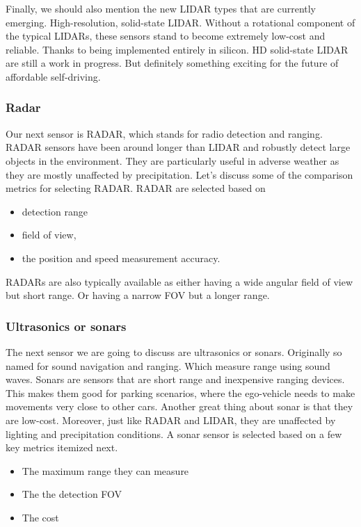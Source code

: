 Finally, we should also mention the new
LIDAR types that are currently emerging. High-resolution, solid-state LIDAR. Without a rotational component
of the typical LIDARs, these sensors stand to become
extremely low-cost and reliable. Thanks to being implemented
entirely in silicon. HD solid-state LIDAR
are still a work in progress. But definitely something exciting for
the future of affordable self-driving. 

\subsubsection{Radar}

Our next sensor is RADAR, which stands for radio detection and ranging. RADAR sensors have been
around longer than LIDAR and robustly detect large objects in the environment. They are particularly useful in adverse
weather as they are mostly unaffected by precipitation. Let's discuss some of the comparison
metrics for selecting RADAR. RADAR are selected based on

\begin{itemize}
\item detection range
\item field of view, 
\item the position and speed measurement accuracy. 
\end{itemize}

RADARs are also typically available as either having a wide angular field of view but short range. 
Or having a narrow FOV but a longer range. 


\subsubsection{Ultrasonics or sonars}

The next sensor we are going to discuss are ultrasonics or sonars. Originally so named for
sound navigation and ranging. Which measure range using sound waves. Sonars are sensors that are short
range and inexpensive ranging devices. This makes them good for parking scenarios, where the ego-vehicle needs to make
movements very close to other cars. Another great thing about sonar is that they are low-cost. Moreover, just like RADAR and LIDAR,
they are unaffected by lighting and precipitation conditions. A sonar sensor is selected based
on a few key metrics itemized next. 

\begin{itemize}
\item The maximum range they can measure
\item The the detection FOV
\item The cost
\end{itemize}

